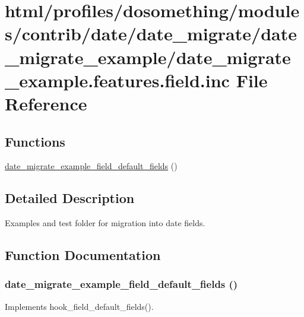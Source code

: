 \hypertarget{date__migrate__example_8features_8field_8inc}{
\section{html/profiles/dosomething/modules/contrib/date/date\_\-migrate/date\_\-migrate\_\-example/date\_\-migrate\_\-example.features.field.inc File Reference}
\label{date__migrate__example_8features_8field_8inc}
}
\subsection*{Functions}
\begin{DoxyCompactItemize}
\item 
\hyperlink{date__migrate__example_8features_8field_8inc_a2010db4a1845105b3cc92d8eaba1dbed}{date\_\-migrate\_\-example\_\-field\_\-default\_\-fields} ()
\end{DoxyCompactItemize}


\subsection{Detailed Description}
Examples and test folder for migration into date fields. 

\subsection{Function Documentation}
\hypertarget{date__migrate__example_8features_8field_8inc_a2010db4a1845105b3cc92d8eaba1dbed}{
\subsubsection[{date\_\-migrate\_\-example\_\-field\_\-default\_\-fields}]{\setlength{\rightskip}{0pt plus 5cm}date\_\-migrate\_\-example\_\-field\_\-default\_\-fields ()}}
\label{date__migrate__example_8features_8field_8inc_a2010db4a1845105b3cc92d8eaba1dbed}
Implements hook\_\-field\_\-default\_\-fields(). 